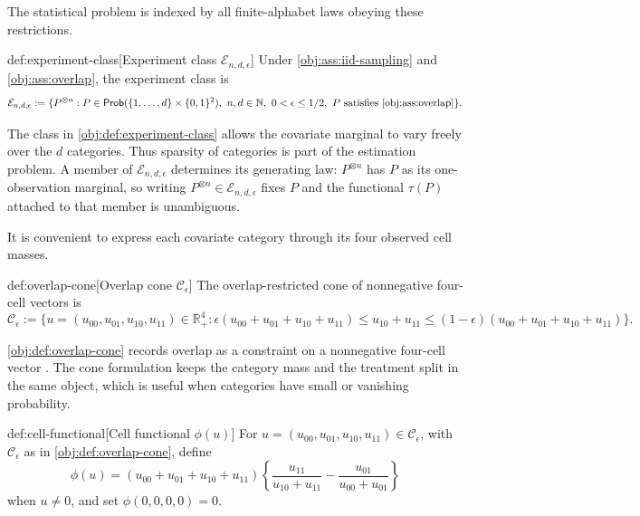 The statistical problem is indexed by all finite-alphabet laws obeying these restrictions.

\begin{definitionv}{def:experiment-class}[Experiment class \(\mathcal E_{n,d,\epsilon}\)]
Under \cref{obj:ass:iid-sampling} and \cref{obj:ass:overlap}, the experiment class is
\[
\mathcal E_{n,d,\epsilon}
:=
\{P^{\otimes n}: P\in\mathsf{Prob}(\{1,\ldots,d\}\times\{0,1\}^2),\ n,d\in\mathbb N,\ 0<\epsilon\le 1/2,\ P\text{ satisfies \cref{obj:ass:overlap}}\}.
\]
\end{definitionv}

The class  in \cref{obj:def:experiment-class} allows the covariate marginal to vary freely over the \(d\) categories. Thus sparsity of categories is part of the estimation problem. A member of \(\mathcal E_{n,d,\epsilon}\) determines its generating law: \(P^{\otimes n}\) has \(P\) as its one-observation marginal, so writing \(P^{\otimes n}\in\mathcal E_{n,d,\epsilon}\) fixes \(P\) and the functional \(\tau(P)\) attached to that member is unambiguous.

It is convenient to express each covariate category through its four observed cell masses.

\begin{definitionv}{def:overlap-cone}[Overlap cone \(\mathcal C_\epsilon\)]
The overlap-restricted cone of nonnegative four-cell vectors is
\[
\mathcal C_\epsilon
:=
\{u=(u_{00},u_{01},u_{10},u_{11})\in\mathbb R_+^4:
\epsilon(u_{00}+u_{01}+u_{10}+u_{11})
\le u_{10}+u_{11}
\le (1-\epsilon)(u_{00}+u_{01}+u_{10}+u_{11})\}.
\]
\end{definitionv}

\cref{obj:def:overlap-cone} records overlap as a constraint on a nonnegative four-cell vector . The cone formulation keeps the category mass and the treatment split in the same object, which is useful when categories have small or vanishing probability.

\begin{definitionv}{def:cell-functional}[Cell functional \(\phi(u)\)]
For \(u=(u_{00},u_{01},u_{10},u_{11})\in\mathcal C_\epsilon\), with \(\mathcal C_\epsilon\) as in \cref{obj:def:overlap-cone}, define
\[
\phi(u)
=
(u_{00}+u_{01}+u_{10}+u_{11})
\left\{
\frac{u_{11}}{u_{10}+u_{11}}
-
\frac{u_{01}}{u_{00}+u_{01}}
\right\}
\]
when \(u\neq 0\), and set \(\phi(0,0,0,0)=0\).
\end{definitionv}


